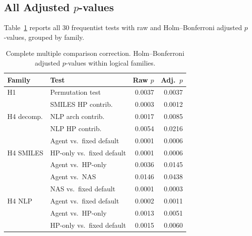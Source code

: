 \subsection{All Adjusted $p$-values}

Table~\ref{tab:all_pvalues} reports all 30 frequentist tests with raw and Holm--Bonferroni adjusted $p$-values, grouped by family.

\begin{table}[h]
\centering
\caption{Complete multiple comparison correction. Holm--Bonferroni adjusted $p$-values within logical families.}
\label{tab:all_pvalues}
\small
\begin{tabular}{@{}llrr@{}}
\toprule
\textbf{Family} & \textbf{Test} & \textbf{Raw $p$} & \textbf{Adj.\ $p$} \\
\midrule
H1 & Permutation test & 0.0037 & 0.0037 \\
\midrule
\multirow{3}{*}{H4 decomp.} & SMILES HP contrib. & 0.0003 & 0.0012 \\
 & NLP arch contrib. & 0.0017 & 0.0085 \\
 & NLP HP contrib. & 0.0054 & 0.0216 \\
\midrule
\multirow{3}{*}{H4 SMILES} & Agent vs.\ fixed default & 0.0001 & 0.0006 \\
 & HP-only vs.\ fixed default & 0.0001 & 0.0006 \\
 & Agent vs.\ HP-only & 0.0036 & 0.0145 \\
 & Agent vs.\ NAS & 0.0146 & 0.0438 \\
\midrule
\multirow{3}{*}{H4 NLP} & NAS vs.\ fixed default & 0.0001 & 0.0003 \\
 & Agent vs.\ fixed default & 0.0002 & 0.0011 \\
 & Agent vs.\ HP-only & 0.0013 & 0.0051 \\
 & HP-only vs.\ fixed default & 0.0015 & 0.0060 \\
\bottomrule
\end{tabular}
\end{table}
